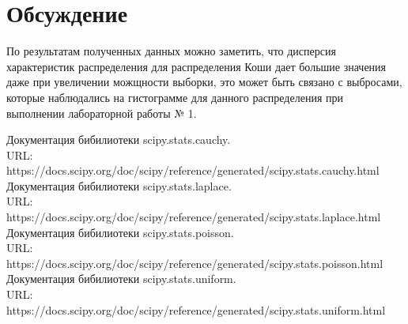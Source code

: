 \documentclass{article}
\begin{document}
\newpage
\section{Обсуждение}
По результатам полученных данных можно заметить, что дисперсия характеристик распределения для распределения Коши дает большие значения даже при увеличении можщности выборки, это может быть связано с выбросами, которые наблюдались на гистограмме для данного распределения при выполнении лабораторной работы № 1.

\newpage
\begin{thebibliography}{4}
Документация бибилиотеки scipy.stats.cauchy. 
\\ URL: https://docs.scipy.org/doc/scipy/reference/generated/scipy.stats.cauchy.html
Документация бибилиотеки scipy.stats.laplace. 
\\ URL: https://docs.scipy.org/doc/scipy/reference/generated/scipy.stats.laplace.html
Документация бибилиотеки scipy.stats.poisson.
\\ URL: https://docs.scipy.org/doc/scipy/reference/generated/scipy.stats.poisson.html
Документация бибилиотеки scipy.stats.uniform.
\\ URL: https://docs.scipy.org/doc/scipy/reference/generated/scipy.stats.uniform.html
\end{thebibliography}
\end{document}

